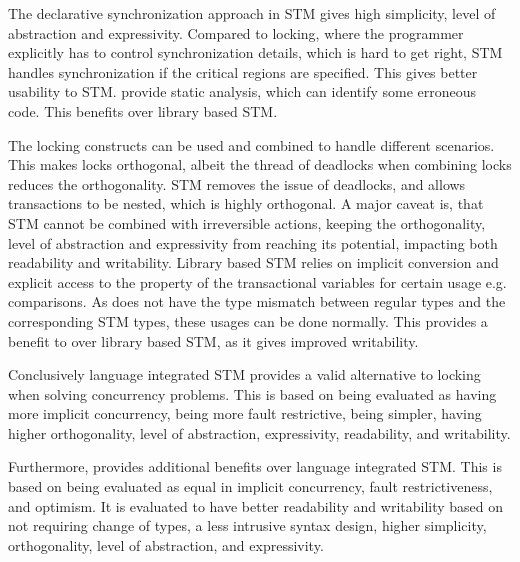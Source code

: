 The declarative synchronization approach in \ac{STM} gives high simplicity, level of abstraction and expressivity. Compared to locking, where the programmer explicitly has to control synchronization details, which is hard to get right, \ac{STM} handles synchronization if the critical regions are specified. This gives better usability to \ac{STM}. \stmname provide static analysis, which can identify some erroneous code. This benefits \stmname over library based \ac{STM}.

The locking constructs can be used and combined to handle different scenarios. This makes locks orthogonal, albeit the thread of deadlocks when combining locks reduces the orthogonality. \ac{STM} removes the issue of deadlocks, and allows transactions to be nested, which is highly orthogonal. A major caveat is, that \ac{STM} cannot be combined with irreversible actions, keeping the orthogonality, level of abstraction and expressivity from reaching its potential, impacting both readability and writability. Library based \ac{STM} relies on implicit conversion and explicit access to the  property of the transactional variables for certain usage e.g. comparisons. As \stmname does not have the type mismatch between regular types and the corresponding \ac{STM} types, these usages can be done normally. This provides a benefit to \stmname over library based \ac{STM}, as it gives improved writability.


Conclusively language integrated \ac{STM} provides a valid alternative to locking when solving concurrency problems. This is based on being evaluated as having more implicit concurrency, being more fault restrictive, being simpler, having higher orthogonality, level of abstraction, expressivity, readability, and writability.

Furthermore, \stmname provides additional benefits over language integrated \ac{STM}. This is based on being evaluated as equal in implicit concurrency, fault restrictiveness, and optimism. It is evaluated to have better readability and writability based on not requiring change of types, a less intrusive syntax design, higher simplicity, orthogonality, level of abstraction, and expressivity.

\worksheetend